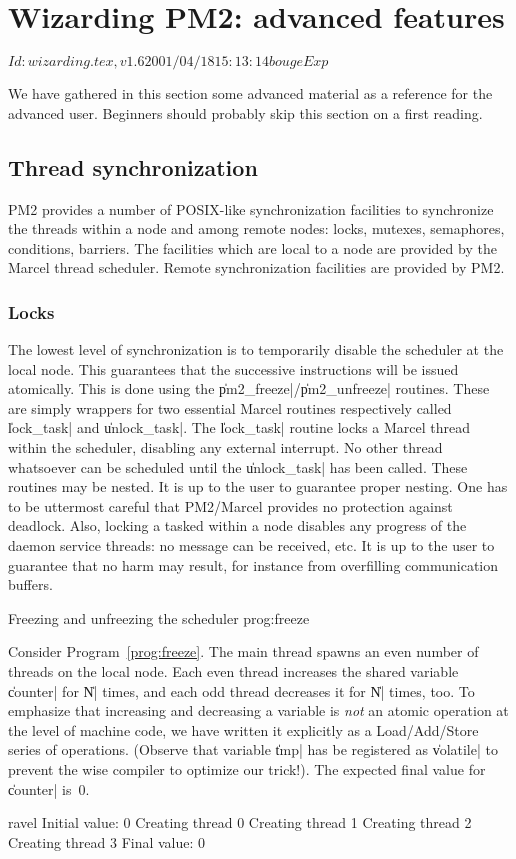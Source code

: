 \chapter{Wizarding PM2: advanced features}

\stamp $Id: wizarding.tex,v 1.6 2001/04/18 15:13:14 bouge Exp $

We have gathered in this section some advanced material as a reference
for the advanced user. Beginners should probably skip this section on
a first reading. 

\section{Thread synchronization}

PM2 provides a number of POSIX-like synchronization facilities to
synchronize the threads within a node and among remote nodes: locks,
mutexes, semaphores, conditions, barriers. The facilities which are
local to a node are provided by the Marcel thread scheduler. Remote
synchronization facilities are provided by PM2.

\subsection{Locks}

The lowest level of synchronization is to temporarily disable the scheduler
at the local node. This guarantees that the successive
instructions will be issued atomically. This is done using the
\|pm2_freeze|/\|pm2_unfreeze| routines. These are simply wrappers for
two essential Marcel routines respectively called \|lock_task| and
\|unlock_task|. The \|lock_task| routine locks a Marcel thread within
the scheduler, disabling any external interrupt. No other thread
whatsoever can be scheduled until the \|unlock_task| has been called.
These routines may be nested. It is up to the user to guarantee proper
nesting. One has to be uttermost careful that PM2/Marcel provides no
protection against deadlock. Also, locking a tasked within a node
disables any progress of the daemon service threads: no message can be
received, etc. It is up to the user to guarantee that no harm may
result, for instance from overfilling communication buffers.

 {Freezing and unfreezing the scheduler}
{prog:freeze}

Consider Program~\ref{prog:freeze}. The main thread spawns an even
number of threads on the local node. Each even thread increases the
shared variable \|counter| for \|N| times, and each odd thread decreases
it for \|N| times, too. To emphasize that increasing and decreasing a
variable is \emph{not} an atomic operation at the level of machine
code, we have written it explicitly as a Load/Add/Store series of
operations. (Observe that variable \|tmp| has be registered as
\|volatile| to prevent the wise compiler to optimize our
trick!). The expected final value for \|counter| is~0.  
\begin{shell}
ravel%
Initial value: 0
Creating thread 0
Creating thread 1
Creating thread 2
Creating thread 3
Final value: 0
\end{shell}

